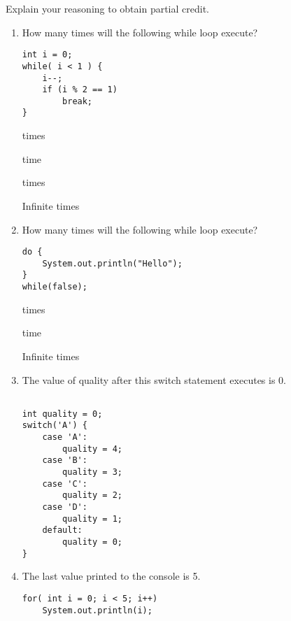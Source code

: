 \Instructions
  Explain your reasoning to obtain partial credit.
\begin{enumerate}
    
\item {} How many times will the following while loop execute? 
\begin{lstlisting}
int i = 0;
while( i < 1 ) {
    i--;
    if (i % 2 == 1)
    	break;
}

\end{lstlisting}

\begin{oneparchoices} 
\hspace{0.2cm}
  times\newline
 
  time \newline
 
  times \newline
 
 \choice Infinite times \newline
 
 
\end{oneparchoices}

\item {} How many times will the following while loop execute? 
\begin{lstlisting}
do {
	System.out.println("Hello");
}
while(false);
\end{lstlisting}

\begin{oneparchoices} 
\hspace{0.2cm}
  times\newline
 
  time \newline
 
 \choice Infinite times \newline
 
\end{oneparchoices}
\item {} \tf The value of quality after this switch statement executes is 0.

\begin{lstlisting}

int quality = 0;
switch('A') {
	case 'A':
		quality = 4;
	case 'B':
		quality = 3;
	case 'C':
		quality = 2;
	case 'D':
		quality = 1;
	default:
		quality = 0;
}
\end{lstlisting}

\item {} \tf The last value printed to the console is 5.

\begin{lstlisting}
for( int i = 0; i < 5; i++)
	System.out.println(i);
\end{lstlisting}

\clearpage

\clearpage
\ifdraft \clearpage \fi

\end{enumerate}   

              
